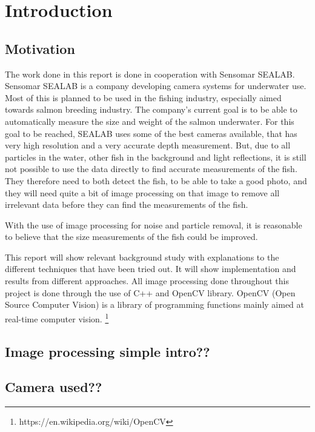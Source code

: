 \section{Introduction}\label{introduction}

\subsection{Motivation}\label{motivation}
The work done in this report is done in cooperation with Sensomar SEALAB.
Sensomar SEALAB is a company developing camera systems for underwater use. Most of this is planned to be used in the fishing industry, especially aimed towards salmon breeding industry. The company's current goal is to be able to automatically measure the size and weight of the salmon underwater. For this goal to be reached, SEALAB uses some of the best cameras available, that has very high resolution and a very accurate depth measurement. But, due to all particles in the water, other fish in the background and light reflections, it is still not possible to use the data directly to find accurate measurements of the fish. They therefore need to both detect the fish, to be able to take a good photo, and they will need quite a bit of image processing on that image to remove all irrelevant data before they can find the measurements of the fish. 

With the use of image processing for noise and particle removal, it is reasonable to believe that the size measurements of the fish could be improved.

This report will show relevant background study with explanations to the different techniques that have been tried out. It will show implementation and results from different approaches. All image processing done throughout this project is done through the use of C++ and OpenCV library. OpenCV (Open Source Computer Vision) is a library of programming functions mainly aimed at real-time computer vision. \footnote{https://en.wikipedia.org/wiki/OpenCV}

\subsection{Image processing simple intro??}

\subsection{Camera used??}
